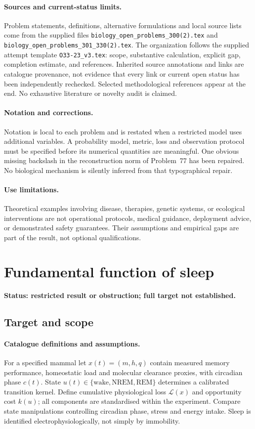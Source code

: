 \documentclass[11pt]{article}
\begin{document}
\paragraph{Sources and current-status limits.}
Problem statements, definitions, alternative formulations and local source lists
come from the supplied files
\texttt{biology\_open\_problems\_300(2).tex} and
\texttt{biology\_open\_problems\_301\_330(2).tex}.
The organization follows the supplied attempt template
\texttt{O33-23\_v3.tex}: scope, substantive calculation, explicit gap,
completion estimate, and references. Inherited source annotations and links are
catalogue provenance, not evidence that every link or current open status has
been independently rechecked. Selected methodological references appear at the
end. No exhaustive literature or novelty audit is claimed.

\paragraph{Notation and corrections.}
Notation is local to each problem and is restated when a restricted model uses
additional variables. A probability model, metric, loss and observation protocol
must be specified before its numerical quantities are meaningful. One obvious
missing backslash in the reconstruction norm of Problem~77 has been repaired.
No biological mechanism is silently inferred from that typographical repair.

\paragraph{Use limitations.}
Theoretical examples involving disease, therapies, genetic systems, or ecological
interventions are not operational protocols, medical guidance, deployment advice,
or demonstrated safety guarantees. Their assumptions and empirical gaps are part
of the result, not optional qualifications.


\section*{Fundamental function of sleep}
\label{prob:115}
\noindent\textbf{Status: restricted result or obstruction; full target not established.}
\subsection{Target and scope}
\paragraph{Catalogue definitions and assumptions.}
For a specified mammal let $x(t)=(m,h,q)$ contain measured memory performance, homeostatic load and molecular clearance proxies, with circadian phase $c(t)$. State $u(t)\in\{\text{wake},\text{NREM},\text{REM}\}$ determines a calibrated transition kernel. Define cumulative physiological loss $\mathcal L(x)$ and opportunity cost $k(u)$; all components are standardised within the experiment. Compare state manipulations controlling circadian phase, stress and energy intake. Sleep is identified electrophysiologically, not simply by immobility.
\end{document}

